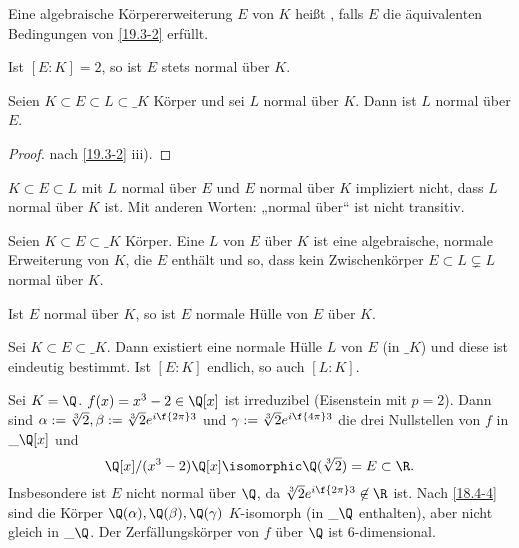 \begin{df} \label{19.3-3}
	Eine algebraische Körpererweiterung $E$ von $K$ heißt , falls $E$ die äquivalenten Bedingungen von \ref{19.3-2} erfüllt.
\end{df}

\begin{note}
	Ist $[E : K] = 2$, so ist $E$ stets normal über $K$.
\end{note}

\begin{kor} \label{19.3-4}
	Seien $K \subset E \subset L \subset \_K$ Körper und sei $L$ normal über $K$.
	Dann ist $L$ normal über $E$.
	\begin{proof}
		nach \ref{19.3-2} iii).
	\end{proof}
\end{kor}

\begin{note}
	$K \subset E \subset L$ mit $L$ normal über $E$ und $E$ normal über $K$ impliziert nicht, dass $L$ normal über $K$ ist.
	Mit anderen Worten: „normal über“ ist nicht transitiv.
\end{note}

\begin{df} \label{19.3-5}
	Seien $K \subset E \subset \_K$ Körper.
	Eine  $L$ von $E$ über $K$ ist eine algebraische, normale Erweiterung von $K$, die $E$ enthält und so, dass kein Zwischenkörper $E \subset L \subsetneq L$ normal über $K$.
\end{df}

\begin{note}
	Ist $E$ normal über $K$, so ist $E$ normale Hülle von $E$ über $K$.
\end{note}

\begin{st} \label{19.3-6}
	Sei $K \subset E \subset \_K$.
	Dann existiert eine normale Hülle $L$ von $E$ (in $\_K$) und diese ist eindeutig bestimmt.
	Ist $[E : K]$ endlich, so auch $[L : K]$.
\end{st}

\begin{ex} \label{19.3-7}
	Sei $K = \Q$.
	$f(x) = x^3 - 2 \in \Q[x]$ ist irreduzibel (Eisenstein mit $p = 2$).
	Dann sind $\alpha := \sqrt[3]{2}, \beta := \sqrt[3]{2} e^{i\f{2\pi}3}$ und $\gamma := \sqrt[3]{2} e^{i\f{4\pi}3}$ die drei Nullstellen von $f$ in $\_{\Q}[x]$ und
	\[
		\Q[x] / (x^3-2)\Q[x] \isomorphic \Q(\sqrt[3]{2}) = E \subset \R.
	\]
	Insbesondere ist $E$ nicht normal über $\Q$, da $\sqrt[3]{2} e^{i\f{2\pi}3} \not\in \R$ ist.
	Nach \ref{18.4-4} sind die Körper $\Q(\alpha), \Q(\beta), \Q(\gamma)$ $K$-isomorph (in $\_\Q$ enthalten), aber nicht gleich in $\_{\Q}$.
	Der Zerfällungskörper von $f$ über $\Q$ ist 6-dimensional.
\end{ex}

